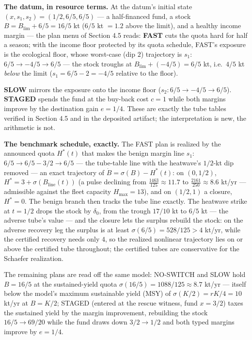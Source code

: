 \documentclass[3p,11pt]{elsarticle}
\begin{document}
\textbf{The datum, in resource terms.} At the datum's initial state
\((x, s_1, s_2) = (1/2, 6/5, 6/5)\) --- a half-financed fund, a stock
\(B = B_{\mathrm{lim}} + 6/5 = 16/5\) kt (\(6/5\) kt \(= 1.2\) above the limit), and a
healthy income margin --- the plan menu of Section 4.5 reads: \textbf{FAST}
cuts the quota hard for half a season; with the income floor protected by its
quota schedule, FAST's exposure is the ecological floor, whose worst-case
(dip \(2\)) trajectory is \(s_1\): \(6/5 \to -4/5 \to 6/5\) --- the stock
troughs at \(B_{\mathrm{lim}} + (-4/5) = 6/5\) kt, i.e.\ \(4/5\) kt
\emph{below} the limit (\(s_1 = 6/5 - 2 = -4/5\) relative to the floor).

\textbf{SLOW} mirrors the exposure onto the income floor
(\(s_2: 6/5 \to -4/5 \to 6/5\)). \textbf{STAGED} spends the fund at the
buy-back cost \(c = 1\) while both margins improve by the destination gain
\(e = 1/4\). These are exactly the tube tables verified in Section 4.5 and
in the deposited artifact; the interpretation is new, the arithmetic is not.

\textbf{The benchmark schedule, exactly.} The FAST plan is realized by the
announced quota \(H^*(t)\) that makes the benign margin line
\(s_1\): \(6/5 \to 6/5 - 3/2 \to 6/5\) --- the tube-table line with the
heatwave's \(1/2\)-kt dip removed --- an exact trajectory
of \(\dot B = \sigma(B) - H^*(t)\): on \((0, 1/2)\),
\(H^* = 3 + \sigma(B_{\mathrm{line}}(t))\) (a pulse declining from
\(\tfrac{1463}{125} \approx 11.7\) to \(\tfrac{2161}{250} \approx 8.6\) kt/yr
--- admissible against the fleet capacity \(H_{\max} = 13\)), and on
\((1/2, 1)\) a closure, \(H^* = 0\). The benign branch then tracks the tube
line exactly. The heatwave strike at \(t = 1/2\) drops the stock by
\(\delta_0\), from the trough \(17/10\) kt to \(6/5\) kt --- the adverse
tube's value --- and the closure lets the surplus rebuild the stock: on the adverse
recovery leg the surplus is at least \(\sigma(6/5) = 528/125 > 4\) kt/yr,
while the certified recovery needs only \(4\), so the realized nonlinear
trajectory lies on or above the certified tube throughout; the certified
tubes are conservative for the Schaefer realization.

The remaining plans are
read off the same model: NO-SWITCH and SLOW hold \(B = 16/5\) at the
sustained-yield quota \(\sigma(16/5) = 1088/125 \approx 8.7\) kt/yr ---
itself below the model's maximum sustainable yield (MSY) of
\(\sigma(K/2) = rK/4 = 10\) kt/yr at \(B = K/2\); STAGED
(entered at the rescue witness, fund \(x = 3/2\)) taxes the sustained yield
by the margin improvement, rebuilding the stock
\(16/5 \to 69/20\) while the fund draws down \(3/2 \to 1/2\) and both typed
margins improve by \(e = 1/4\).
\end{document}
